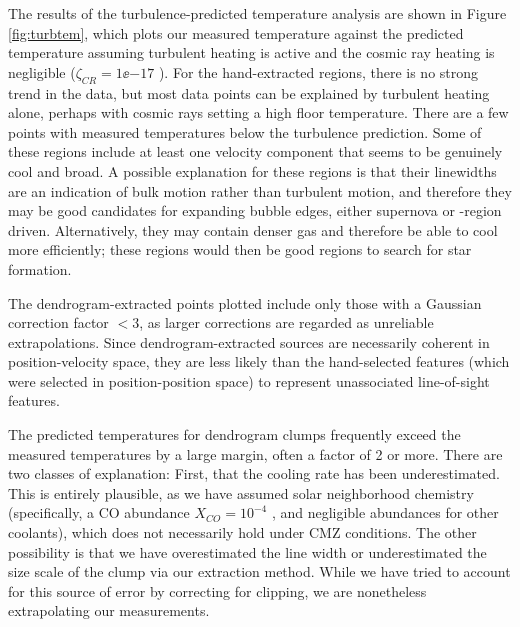 The results of the turbulence-predicted temperature analysis are shown in 
Figure \ref{fig:turbtem}, which plots our measured temperature against
the predicted temperature assuming turbulent heating is active and the
cosmic ray heating is negligible ($\zeta_{CR}=1\ee{-17}$ \pers).  For the
hand-extracted regions, there is no strong trend in the data, but most data
points can be explained by turbulent heating alone, perhaps with cosmic rays
setting a high floor temperature.  There are a few points with measured
temperatures below the turbulence prediction.  Some of these regions
include at least one velocity component that seems
to be genuinely cool and broad.  A possible explanation for these regions is
that their linewidths are an indication of bulk motion rather than turbulent
motion, and therefore they may be good candidates for expanding bubble edges,
either supernova or \hii-region driven.  Alternatively, they may contain denser
gas and therefore be able to cool more efficiently; these regions would then be
good regions to search for star formation.

The dendrogram-extracted points plotted include only those with a Gaussian
correction factor $<3$, as larger corrections are regarded as unreliable
extrapolations.  Since dendrogram-extracted sources are necessarily coherent in
position-velocity space, they are less likely than the hand-selected features
(which were selected in position-position space) to represent unassociated
line-of-sight features.

The predicted temperatures for dendrogram clumps frequently exceed the measured
temperatures by a large margin, often a factor of 2 or more.  There are two
classes of explanation: First, that the cooling rate has been underestimated.
This is entirely plausible, as we have assumed solar neighborhood chemistry
(specifically, a CO abundance $X_{CO}=10^{-4}$ \hh, and negligible abundances
for other
coolants), which does not necessarily hold under CMZ conditions.  The other
possibility is that we have overestimated the line width or underestimated the
size scale of the clump via our extraction method.  While we have tried to
account for this source of error by correcting for clipping, we are nonetheless
extrapolating our measurements.

%

